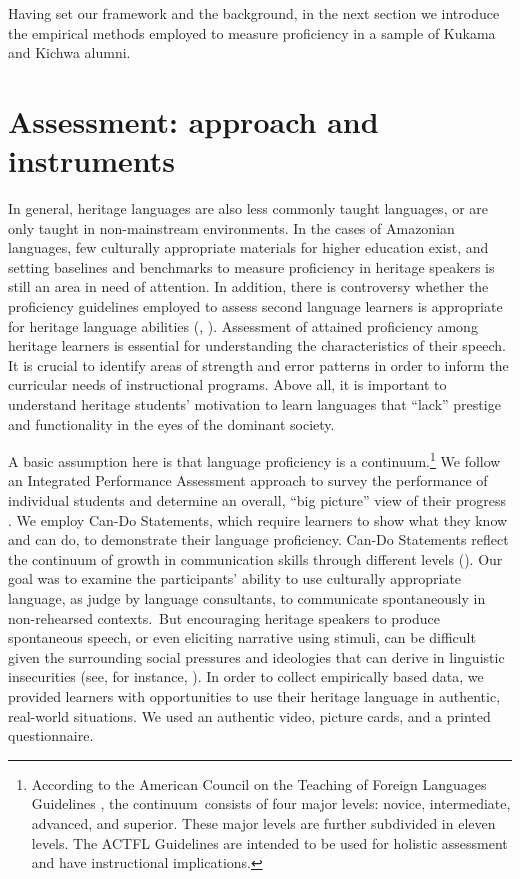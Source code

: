 \documentclass[output=paper]{langscibook}
\begin{document}
Having set our framework and the background, in the next section we introduce the empirical methods employed to measure proficiency in a sample of Kukama and Kichwa alumni.


\section{{Assessment: approach and instruments} }\label{sec:7:4}

In general, heritage languages are also less commonly taught languages, or are only taught in non-mainstream environments. In the cases of Amazonian languages, few culturally appropriate materials for higher education exist, and setting baselines and benchmarks to measure proficiency in heritage speakers is still an area in need of attention. In addition, there is controversy whether the proficiency guidelines employed to assess second language learners is appropriate for heritage language abilities (\citealt{Valdés1989}, \citealt{MartinEtAl2013}). Assessment of attained proficiency among heritage learners is essential for understanding the characteristics of their speech. It is crucial to identify areas of strength and error patterns in order to inform the curricular needs of instructional programs. Above all, it is important to understand heritage students' motivation to learn languages that “lack” prestige and functionality in the eyes of the dominant society.

A basic assumption here is that language proficiency is a continuum.\footnote{According to the American Council on the Teaching of Foreign Languages Guidelines \citep{ACTFL2012}, the continuum~consists of four major levels: novice, intermediate, advanced, and superior. These major levels are further subdivided in eleven levels. The ACTFL Guidelines are intended to be used for holistic assessment and have instructional implications.} We follow an Integrated Performance Assessment approach to survey the performance of individual students and determine an overall, “big picture” view of their progress \citep{ACTFL2012}. We employ Can-Do Statements, which require learners to show what they know and can do, to demonstrate their language proficiency. Can-Do Statements reflect the continuum of growth in communication skills through different levels (\citealt{MoellerYu2015}). Our goal was to examine the participants’ ability to use culturally appropriate language, as judge by language consultants, to communicate spontaneously in non-rehearsed contexts.~But encouraging heritage speakers to produce spontaneous speech, or even eliciting narrative using stimuli, can be difficult given the surrounding social pressures and ideologies that can derive in linguistic insecurities (see, for instance, \citealt{Silva-Corvalán1994}). In order to collect empirically based data, we provided learners with opportunities to use their heritage language in authentic, real-world situations. We used an authentic video, picture cards, and a printed questionnaire.
\end{document}
